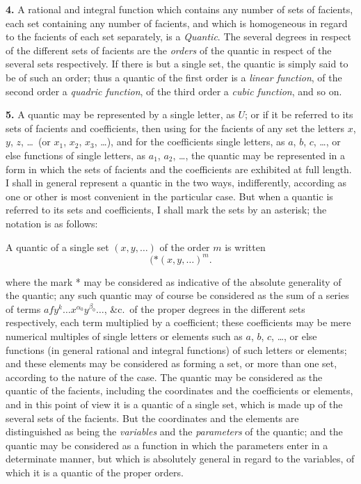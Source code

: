 \documentclass[11pt,a4paper]{book}
\begin{document}
\textbf{4.} A rational and integral function which contains any number of sets of facients, each set containing any number of facients, and which is homogeneous in regard to the facients of each set separately, is a \textit{Quantic}. The several degrees in respect of the different sets of facients are the \textit{orders} of the quantic in respect of the several sets respectively. If there is but a single set, the quantic is simply said to be of such an order; thus a quantic of the first order is a \textit{linear function}, of the second order a \textit{quadric function}, of the third order a \textit{cubic function}, and so on.

\textbf{5.} A quantic may be represented by a single letter, as $U$; or if it be referred to its sets of facients and coefficients, then using for the facients of any set the letters $x$, $y$, $z$, \ldots\ (or $x_1$, $x_2$, $x_3$, \ldots), and for the coefficients single letters, as $a$, $b$, $c$, \ldots, or else functions of single letters, as $a_1$, $a_2$, \ldots, the quantic may be represented in a form in which the sets of facients and the coefficients are exhibited at full length. I shall in general represent a quantic in the two ways, indifferently, according as one or other is most convenient in the particular case. But when a quantic is referred to its sets and coefficients, I shall mark the sets by an asterisk; the notation is as follows:

A quantic of a single set $(x, y, \ldots)$ of the order $m$ is written
\[
(*\!\!\!\!\!(x, y, \ldots)^m.
\]

\newpage
\setcounter{page}{223}

where the mark * may be considered as indicative of the absolute generality of the quantic; any such quantic may of course be considered as the sum of a series of terms $afy^k \ldots x^{\alpha_0} y^{\beta_0} \ldots$, \&c.\ of the proper degrees in the different sets respectively, each term multiplied by a coefficient; these coefficients may be mere numerical multiples of single letters or elements such as $a$, $b$, $c$, \ldots, or else functions (in general rational and integral functions) of such letters or elements; and these elements may be considered as forming a set, or more than one set, according to the nature of the case. The quantic may be considered as the quantic of the facients, including the coordinates and the coefficients or elements, and in this point of view it is a quantic of a single set, which is made up of the several sets of the facients. But the coordinates and the elements are distinguished as being the \textit{variables} and the \textit{parameters} of the quantic; and the quantic may be considered as a function in which the parameters enter in a determinate manner, but which is absolutely general in regard to the variables, of which it is a quantic of the proper orders.
\end{document}
